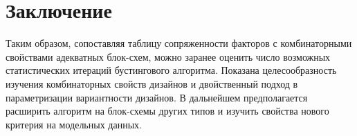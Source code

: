 \documentclass{math-mech-sci}
\begin{document}
\section{Заключение}


Таким образом, сопоставляя таблицу сопряженности факторов с  комбинаторными свойствами адекватных блок-схем, можно  заранее оценить число возможных статистических итераций бустингового алгоритма.   
Показана целесообразность изучения комбинаторных свойств дизайнов и двойственный подход в параметризации 
вариантности дизайнов. В дальнейшем предполагается расширить алгоритм на блок-схемы других типов и изучить свойства нового  критерия на модельных данных. 




\renewcommand\refname{Литература}
\end{document}
